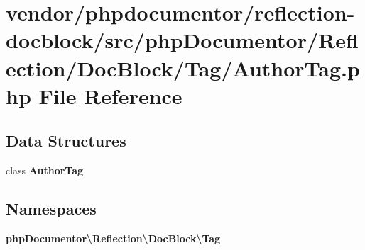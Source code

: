 \section{vendor/phpdocumentor/reflection-\/docblock/src/php\+Documentor/\+Reflection/\+Doc\+Block/\+Tag/\+Author\+Tag.php File Reference}
\label{_author_tag_8php}
\subsection*{Data Structures}
\begin{DoxyCompactItemize}
\item 
class {\bf Author\+Tag}
\end{DoxyCompactItemize}
\subsection*{Namespaces}
\begin{DoxyCompactItemize}
\item 
 {\bf php\+Documentor\textbackslash{}\+Reflection\textbackslash{}\+Doc\+Block\textbackslash{}\+Tag}
\end{DoxyCompactItemize}
